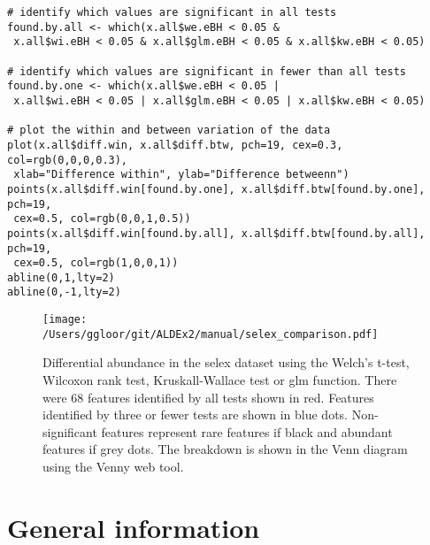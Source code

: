 \documentclass[11pt]{article}
\begin{document}
\begin{verbatim}
# identify which values are significant in all tests
found.by.all <- which(x.all$we.eBH < 0.05 & 
 x.all$wi.eBH < 0.05 & x.all$glm.eBH < 0.05 & x.all$kw.eBH < 0.05)

# identify which values are significant in fewer than all tests
found.by.one <- which(x.all$we.eBH < 0.05 | 
 x.all$wi.eBH < 0.05 | x.all$glm.eBH < 0.05 | x.all$kw.eBH < 0.05)

# plot the within and between variation of the data
plot(x.all$diff.win, x.all$diff.btw, pch=19, cex=0.3, col=rgb(0,0,0,0.3),
 xlab="Difference within", ylab="Difference betweenn")
points(x.all$diff.win[found.by.one], x.all$diff.btw[found.by.one], pch=19, 
 cex=0.5, col=rgb(0,0,1,0.5))
points(x.all$diff.win[found.by.all], x.all$diff.btw[found.by.all], pch=19, 
 cex=0.5, col=rgb(1,0,0,1))
abline(0,1,lty=2)
abline(0,-1,lty=2)
\end{verbatim}

\begin{figure}[!h]
\begin{center}
\texttt{[image: /Users/ggloor/git/ALDEx2/manual/selex\_comparison.pdf]}
\caption{Differential abundance in the selex dataset using the Welch's t-test, Wilcoxon rank test, Kruskall-Wallace test or  glm function. There were 68 features identified by all tests shown in red. Features identified by three or fewer tests are shown in blue dots.  Non-significant features represent rare features if black and abundant features if grey dots. The breakdown is shown in the Venn diagram using the Venny web tool\cite{oliveros:2007}. }
\label{selex}\vspace{-0.8cm}
\end{center}
\end{figure}

\newpage

\section{General information}
\end{document}
